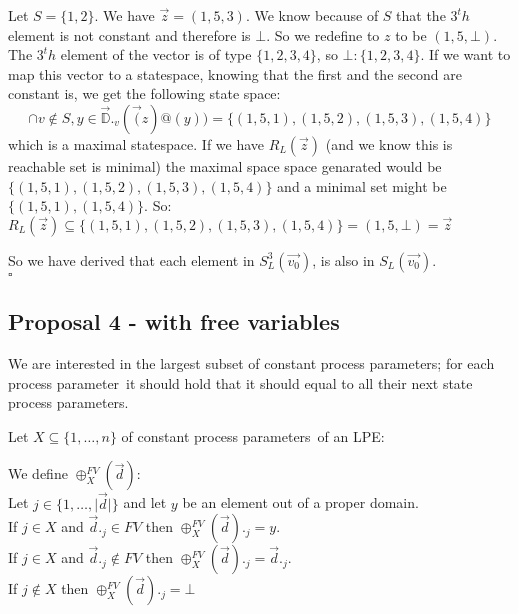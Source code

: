 \index{}\documentclass[a4paper,10pt]{article}
\theoremstyle{plain}
\theoremstyle{definition}
\newcommand{\ovr}{\overrightarrow}
\newcommand{\pp}{process parameter}
\newcommand{\pps}{process parameters}
\newcommand{\sq}{$\square$}
\begin{document}
\begin{itemize}
\begin{example}
Let $S = \lbrace 1, 2 \rbrace$.
We have $\ovr{z} = (1, 5, 3)$. 
We know because of $S$ that the $3^th$ element is not constant and therefore is $\bot$.
So we redefine to $z$ to be $(1, 5, \bot)$.
The $3^th$ element of the vector is of type $\lbrace 1, 2, 3, 4\rbrace$, so $\bot : \lbrace 1, 2, 3, 4 \rbrace$.
If we want to map this vector to a statespace, knowing that the first and the second are
constant is, we get the following state space: 
$$ \cap v \not\in S, y \in \ovr{\mathbb{D}}._v(\ovr(z)@(y)) = \lbrace (1, 5, 1), (1, 5, 2), (1, 5, 3), (1, 5, 4) \rbrace$$
which is a maximal statespace. 
If we have $R_L(\ovr{z})$ (and we know this is reachable set is minimal) the maximal space space genarated would be 
$\lbrace (1, 5, 1), (1, 5, 2), (1, 5, 3), (1, 5, 4) \rbrace$ and a minimal set might be $\lbrace (1, 5, 1), (1, 5, 4) \rbrace$. 
So:
$R_L(\ovr{z}) \subseteq \lbrace (1, 5, 1), (1, 5, 2), (1, 5, 3), (1, 5, 4) \rbrace =  (1, 5, \bot) = \ovr{z} $\\
\end{example}

\end{itemize}
So we have derived that each element in $S_L^3(\ovr{v_0})$, is also in $S_L(\ovr{v_0})$.
\\ \sq


\newpage
\subsection{Proposal 4 - with free variables}

We are interested in the largest subset of constant \pps ; for each \pp\ it should hold that it should equal to all their next state \pps.

Let $X \subseteq \lbrace 1, \ldots, n \rbrace$ of constant \pps\ of an LPE:

\begin{defn} We define $\oplus_X^{FV}(\ovr{d})$:\\
Let $j \in \lbrace 1, \dots, \vert \ovr{d} \vert \rbrace $ and let $y$ be an element out of a proper domain.\\
If $j \in X$ and $\ovr{d}._j \in FV $ then $\oplus_X^{FV}(\ovr{d})._j = y$. \\
If $j \in X$ and $\ovr{d}._j \not\in FV $ then $\oplus_X^{FV}(\ovr{d})._j = \ovr{d}._j$.\\
If $j \not\in X$ then $\oplus_X^{FV}(\ovr{d})._j = \bot$\\
\end{defn}
\end{document}
